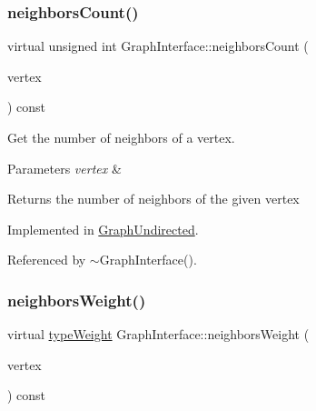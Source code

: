 \subsubsection{\texorpdfstring{neighbors\+Count()}{neighborsCount()}}
{\footnotesize\ttfamily virtual unsigned int Graph\+Interface\+::neighbors\+Count (\begin{DoxyParamCaption}\item[{const \hyperlink{edge_8h_a5fbd20c46956d479cb10afc9855223f6}{type\+Vertex} \&}]{vertex }\end{DoxyParamCaption}) const\hspace{0.3cm}{\ttfamily [pure virtual]}}



Get the number of neighbors of a vertex. 


\begin{DoxyParams}{Parameters}
{\em vertex} & \\
\hline
\end{DoxyParams}
\begin{DoxyReturn}{Returns}
the number of neighbors of the given vertex 
\end{DoxyReturn}


Implemented in \hyperlink{classGraphUndirected_a90fdfbabe541262292733703d839812a}{Graph\+Undirected}.



Referenced by $\sim$\+Graph\+Interface().

\mbox{\label{classGraphInterface_a77b93eb2da955cb41b389df023676c1b}} 
\subsubsection{\texorpdfstring{neighbors\+Weight()}{neighborsWeight()}}
{\footnotesize\ttfamily virtual \hyperlink{edge_8h_a2e7ea3be891ac8b52f749ec73fee6dd2}{type\+Weight} Graph\+Interface\+::neighbors\+Weight (\begin{DoxyParamCaption}\item[{const \hyperlink{edge_8h_a5fbd20c46956d479cb10afc9855223f6}{type\+Vertex} \&}]{vertex }\end{DoxyParamCaption}) const\hspace{0.3cm}{\ttfamily [pure virtual]}}



